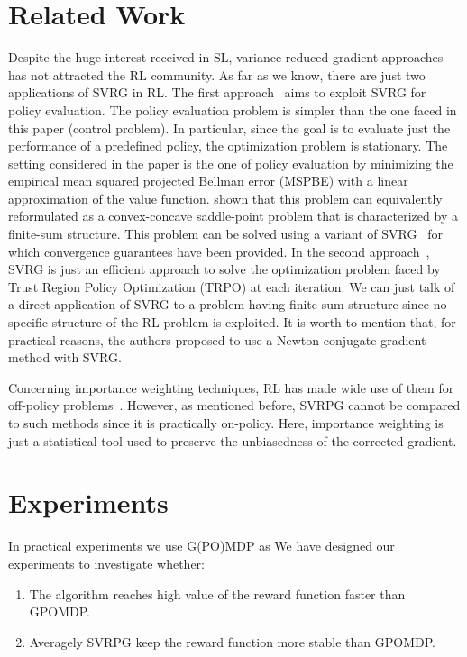 \documentclass{article}
\makeatletter
\theoremstyle{remark}
\theoremstyle{definition}
\DeclareRobustCommand{\eg}{e.g.,\@\xspace}
\makeatother
\begin{document}
\section{Related Work}
Despite the huge interest received in SL, variance-reduced gradient approaches has not attracted the RL community.
As far as we know, there are just two applications of SVRG in RL.
The first approach~\citep{du2017svrgpe} aims to exploit SVRG for policy evaluation.
The policy evaluation problem is simpler than the one faced in this paper (control problem).
In particular, since the goal is to evaluate just the performance of a predefined policy, the optimization problem is stationary.
The setting considered in the paper is the one of policy evaluation by minimizing the empirical mean squared projected Bellman error (MSPBE) with a linear approximation of the value function. \citet{du2017svrgpe} shown that this problem can equivalently reformulated as a convex-concave saddle-point problem that is characterized by a finite-sum structure.
This problem can be solved using a variant of SVRG~\citep{Palaniappan2016svrgsaddle} for which convergence guarantees have been provided.
In the second approach~\citep{xu2017svrgtrpo}, SVRG is just an efficient approach to solve the optimization problem faced by Trust Region Policy Optimization (TRPO) at each iteration. We can just talk of a direct application of SVRG to a problem having finite-sum structure since no specific structure of the RL problem is exploited.
It is worth to mention that, for practical reasons, the authors proposed to use a Newton conjugate gradient method with SVRG.

Concerning importance weighting techniques, RL has made wide use of them for off-policy problems~\citep[\eg][]{precup2000eligibility,thomas2015high}. However, as mentioned before, SVRPG cannot be compared to such methods since it is practically on-policy. Here, importance weighting is just a statistical tool used to preserve the unbiasedness of the corrected gradient.


\section{Experiments}\label{sec:exp}
In practical experiments we use G(PO)MDP as 
We have designed our experiments to investigate whether:
\begin{enumerate}
\item The algorithm reaches high value of the reward function faster than GPOMDP.
\item Averagely SVRPG keep the reward function more stable than GPOMDP.
\end{enumerate}
\end{document}

